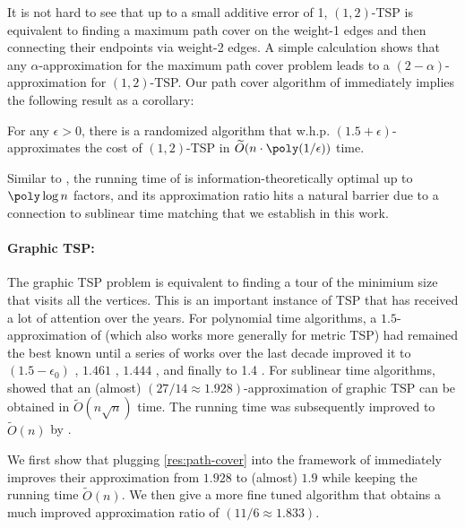 It is not hard to see that up to a small additive error of 1, $(1,2)$-TSP is equivalent to finding a maximum path cover on the weight-1 edges and then connecting their endpoints via weight-2 edges. A simple calculation shows that any $\alpha$-approximation for the maximum path cover problem leads to a $(2-\alpha)$-approximation for $(1,2)$-TSP. Our path cover algorithm of  immediately implies the following result as a corollary:
\begin{graytbox}
\begin{result}\label{res:12-TSP}
    For any $\epsilon > 0$, there is a randomized algorithm that w.h.p. $(1.5+\epsilon)$-approximates the cost of $(1,2)$-TSP in $\widetilde{O}(n \cdot \poly(1/\epsilon))$ time.
\end{result}
\end{graytbox}

Similar to , the running time of  is information-theoretically optimal up to $\poly\log n$ factors, and its approximation ratio hits a natural barrier due to a connection to sublinear time matching that we establish in this work.

\paragraph{Graphic TSP:} The graphic TSP problem is equivalent to finding a tour of the minimium size that visits all the vertices. This is an important instance of TSP that has received a lot of attention over the years. For polynomial time algorithms, a $1.5$-approximation of \citet*{christofides1976worst} (which also works more generally for metric TSP) had remained the best known until a series of works over the last decade improved it to $(1.5 - \epsilon_0)$ \cite{GharanSS11}, $1.461$ \cite{MomkeS11}, $1.444$ \cite{Mucha12}, and finally to 1.4 \cite{SeboV14}. For sublinear time algorithms, \citet*{chen2020} showed that an (almost) $(27/14 \approx 1.928)$-approximation of graphic TSP can be obtained in $\widetilde{O}(n \sqrt{n})$ time. The running time was subsequently improved to $\widetilde{O}(n)$ by \citet*{behnezhad2021}.

We first show that plugging \cref{res:path-cover} into the framework of \cite{chen2020} immediately improves their approximation from $1.928$ to (almost) $1.9$ while keeping the running time $\widetilde{O}(n)$. We then give a more fine tuned algorithm that obtains a much improved approximation ratio of $(11/6 \approx 1.833)$.

